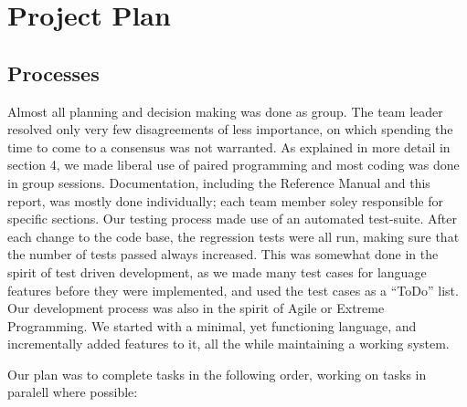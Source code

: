 \chapter{Project Plan}

\section{Processes}

Almost all planning and decision making was done as group.  The team leader resolved only very few disagreements of less importance, on which spending the time to come to a consensus was not warranted.  As explained in more detail in section 4, we made liberal use of paired programming and most coding was done in group sessions.  Documentation, including the Reference Manual and this report, was mostly done individually; each team member soley responsible for specific sections.  Our testing process made use of an automated test-suite.  After each change to the code base, the regression tests were all run, making sure that the number of tests passed always increased.  This was somewhat done in the spirit of test driven development, as we made many test cases for language features before they were implemented, and used the test cases as a ``ToDo'' list.  Our development process was also in the spirit of Agile or Extreme Programming.  We started with a minimal, yet functioning language, and incrementally added features to it, all the while maintaining a working system.  

Our plan was to complete tasks in the following order, working on tasks in paralell where possible:

